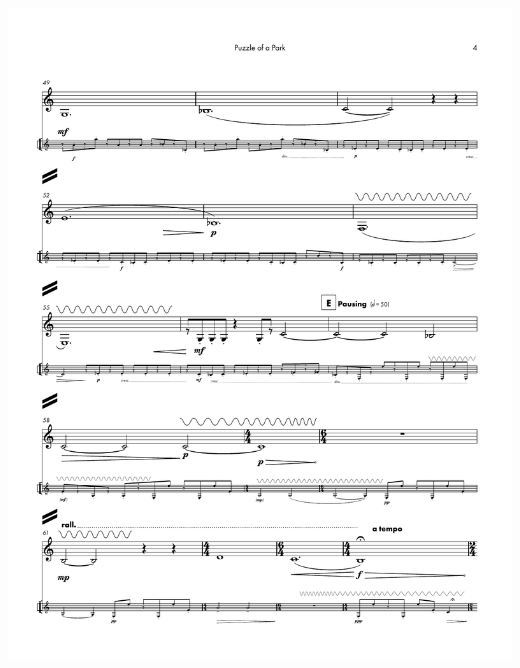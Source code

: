     \begin{center}
    \includegraphics[scale=0.75]{Scores/puzzlePart9.pdf}
    \end{center}
    \newpage
